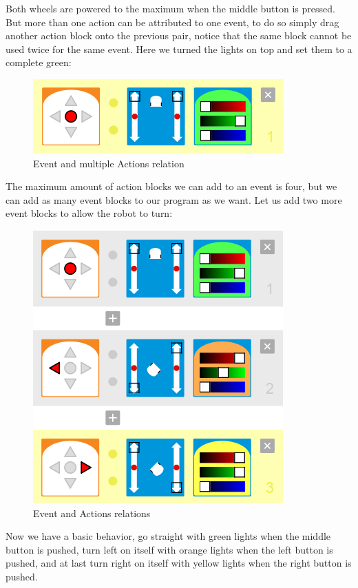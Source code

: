\documentclass{scrartcl}
\begin{document}
Both wheels are powered to the maximum when the middle button is pressed. But more than one action can be attributed to one event, 
to do so simply drag another action block onto the previous pair, notice that the same block cannot be used twice for the same event. 
Here we turned the lights on top and set them to a complete green:\\
\begin{figure}
  \centering
  \includegraphics[scale=0.5]{./VPL/middlebtn_forward_green}
  \caption{Event and multiple Actions relation}
  \label{fig:thymio_vpl_middlebtn_1e2a}
\end{figure}

The maximum amount of action blocks we can add to an event is four, but we can add as many event blocks to our program as we want. 
Let us add two more event blocks to allow the robot to turn:\\
\begin{figure}
  \centering
  \includegraphics[scale=0.5]{./VPL/middlebtn_3E}
  \caption{Event and Actions relations}
  \label{fig:thymio_vpl_middlebtn_3e6a}
\end{figure}

Now we have a basic behavior, go straight with green lights when the middle button is pushed, turn left on itself with orange lights when the left button is pushed, 
and at last turn right on itself with yellow lights when the right button is pushed.\\
\end{document}
